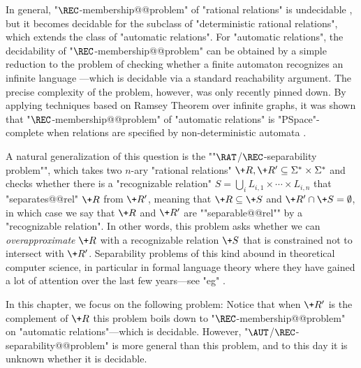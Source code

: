 In general, "$\REC$-membership@@problem" of "rational relations" is undecidable
\cite[\S~III, Theorem~8.4]{Berstel1979Transductions},
but it becomes decidable  for the subclass of 
"deterministic rational relations", which extends the class of "automatic relations".
For "automatic relations", the decidability of "$\REC$-membership@@problem"
can be obtained by a  simple reduction to the problem of checking whether a finite automaton 
recognizes an infinite language \cite{LodingSpinrath2019DecisionProblems}---which is decidable via 
a standard reachability argument. 
The precise complexity of the problem, however, was only recently pinned down.
By applying techniques based on Ramsey Theorem over infinite graphs, it was shown that 
"$\REC$-membership@@problem" of "automatic relations" is 
"PSpace"-complete when relations are specified by non-deterministic automata
\cite[Theorem 1]{BarceloHongLeLinNiskanen2019MonadicDecomposability} \cite[Corollary 2.9]{BergstrasserGanardiLinZetzsche2022RamseyQuantifiers}.

\AP A natural generalization of this question is the
""$\RAT$/$\REC$-separability problem"", which takes two $n$-ary "rational relations" 
$\+R,\+R' \subseteq \Sigma^* \times \Sigma^*$ and checks whether there is a "recognizable relation" 
$S = \bigcup_i L_{i,1} \times \cdots \times L_{i,n}$ that "separates@@rel" $\+R$ from $\+R'$, meaning that $\+R \subseteq \+S$ and $\+R' \cap \+S = \emptyset$, in which case we say that $\+R$
and $\+R'$ are \AP""separable@@rel"" by a "recognizable relation".
In other words, this problem asks whether we can \emph{overapproximate} $\+R$ with a recognizable 
relation $\+S$ that is constrained not to intersect with $\+R'$. Separability problems of this kind abound in theoretical computer science, in particular
in formal language theory where they have gained a lot of attention over the last few years---see "eg" \cite{PlaceZeitoun2016SeparatingRegularLanguages,Kopczynski2016InvisiblePushdownLanguages,CzerwinskiMartensRooijenZeitounZetzsche2017DecidableSeparabilityPiecewiseTestable,ClementeCzerwinskiLasotaPaperman2017RegularSeparabilityParikhAutomata}. 

In this chapter, we focus on the following problem:
Notice that when $\+R'$ is the complement of $\+R$ this problem boils down to "$\REC$-membership@@problem" on "automatic relations"---which is decidable. 
However, "$\AUT$/$\REC$-separability@@problem" is more general than this problem,
and to this day it is unknown whether it is decidable. 


